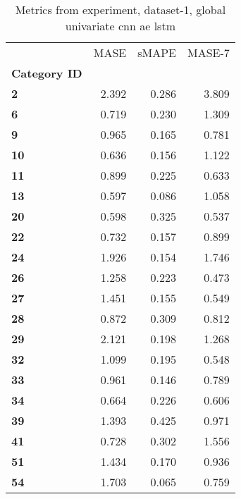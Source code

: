 \begin{table}[h]
\centering
\caption{Metrics from experiment, dataset-1, global univariate cnn ae lstm}
\label{table:global-univariate-cnn-ae-lstm-dataset-1}
\begin{tabular}{lrrr}
\toprule
{} &   MASE &  sMAPE &  MASE-7 \\
\textbf{Category ID} &        &        &         \\
\midrule
\textbf{2          } &  2.392 &  0.286 &   3.809 \\
\textbf{6          } &  0.719 &  0.230 &   1.309 \\
\textbf{9          } &  0.965 &  0.165 &   0.781 \\
\textbf{10         } &  0.636 &  0.156 &   1.122 \\
\textbf{11         } &  0.899 &  0.225 &   0.633 \\
\textbf{13         } &  0.597 &  0.086 &   1.058 \\
\textbf{20         } &  0.598 &  0.325 &   0.537 \\
\textbf{22         } &  0.732 &  0.157 &   0.899 \\
\textbf{24         } &  1.926 &  0.154 &   1.746 \\
\textbf{26         } &  1.258 &  0.223 &   0.473 \\
\textbf{27         } &  1.451 &  0.155 &   0.549 \\
\textbf{28         } &  0.872 &  0.309 &   0.812 \\
\textbf{29         } &  2.121 &  0.198 &   1.268 \\
\textbf{32         } &  1.099 &  0.195 &   0.548 \\
\textbf{33         } &  0.961 &  0.146 &   0.789 \\
\textbf{34         } &  0.664 &  0.226 &   0.606 \\
\textbf{39         } &  1.393 &  0.425 &   0.971 \\
\textbf{41         } &  0.728 &  0.302 &   1.556 \\
\textbf{51         } &  1.434 &  0.170 &   0.936 \\
\textbf{54         } &  1.703 &  0.065 &   0.759 \\
\bottomrule
\end{tabular}
\end{table}
